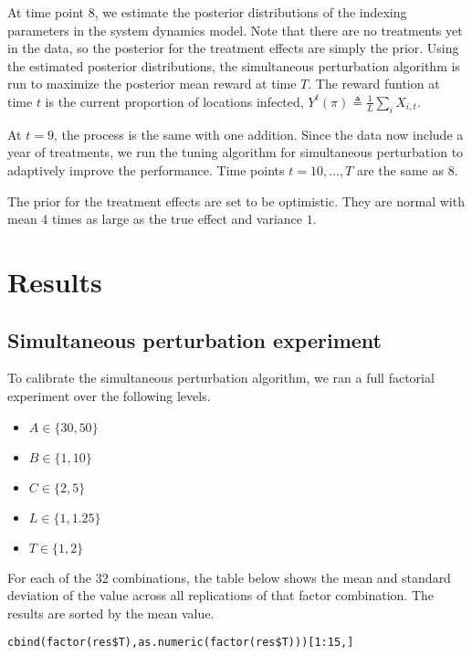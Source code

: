 \documentclass[11pt]{article}
\begin{document}
At time point $8$, we estimate the posterior distributions of the
indexing parameters in the system dynamics model.  Note that there
are no treatments yet in the data, so the posterior for the
treatment effects are simply the prior.  Using the estimated
posterior distributions, the simultaneous perturbation algorithm is
run to maximize the posterior mean reward at time $T$.  The reward
funtion at time $t$ is the current proportion of locations infected,
$Y^t(\pi) \triangleq \frac{1}{L}\sum_i X_{i,t}$.

At $t = 9$, the process is the same with one addition.  Since the
data now include a year of treatments, we run the tuning algorithm
for simultaneous perturbation to adaptively improve the performance.
Time points $t=10,\ldots,T$ are the same as $8$.

The prior for the treatment effects are set to be optimistic.  They
are normal with mean $4$ times as large as the true effect and
variance $1$.


\section{Results}
\label{sec-5}

\subsection{Simultaneous perturbation experiment}
\label{sec-5-1}

To calibrate the simultaneous perturbation algorithm, we ran a full
factorial experiment over the following levels.
\begin{itemize}
  \item $A \in \lbrace 30, 50 \rbrace $
  \item $B \in \lbrace 1, 10 \rbrace $
  \item $C \in \lbrace 2, 5 \rbrace $
  \item $L \in \lbrace 1, 1.25 \rbrace $
  \item $T \in \lbrace 1, 2 \rbrace $
\end{itemize}

For each of the $32$ combinations, the table below shows the mean and
standard deviation of the value across all replications of that factor
combination.  The results are sorted by the mean value.
\lstset{language=R,label= ,caption= ,numbers=none}
\begin{lstlisting}
cbind(factor(res$T),as.numeric(factor(res$T)))[1:15,]
\end{lstlisting}
\end{document}
